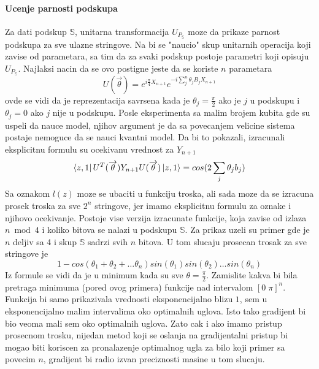 \documentclass[12pt, letterpaper, oneside]{article}
\begin{document}
\paragraph{Ucenje parnosti podskupa}
Za dati podskup $\mathbb{S}$, unitarna transformacija $U_{P_\mathbb{S}}$ moze da prikaze parnost podskupa za sve ulazne stringove.
Na bi se "naucio" skup unitarnih operacija koji zavise od parametara, sa tim da za svaki podskup postoje parametri koji opisuju $U_{P_\mathbb{S}}$.
Najlaksi nacin da se ovo postigne jeste da se koriste $n$ parametara
\[
    U(\overrightarrow{\theta}) = e^{i\frac{\pi}{4}X_{n+1}}e^{-i\sum_j^n \theta_jB_jX_{n+1}}
\]
ovde se vidi da je reprezentacija savrsena kada je $\theta_j = \frac{\pi}{2}$ ako je $j$ u podskupu i$\theta_j = 0$ ako $j$ nije u podskupu.
Posle eksperimenta sa malim brojem kubita gde su uspeli da nauce model, njihov argument je da sa povecanjem velicine sistema postaje nemoguce da se nauci kvantni model.
Da bi to pokazali, izracunali eksplicitnu formulu su ocekivanu vrednost za $Y_{n+1}$
\[
    \bra{z,1}U^T(\overrightarrow{\theta})Y_{n+1}U(\overrightarrow{\theta})\Ket{z,1} = cos(2\sum_j\theta_jb_j)
\]
Sa oznakom $l(z)$ moze se ubaciti u funkciju troska, ali sada moze da se izracuna prosek
troska za sve $2^n$ stringove, jer imamo eksplicitnu formulu za oznake i njihovo ocekivanje.
Postoje vise verzija izracunate funkcije, koja zavise od izlaza $n \bmod 4$ i koliko bitova se nalazi u podskupu $\mathbb{S}$.
Za prikaz uzeli su primer gde je $n$ deljiv sa 4 i skup $\mathbb{S}$ sadrzi svih $n$ bitova.
U tom slucaju prosecan trosak za sve stringove je 
\[
    1 - cos(\theta_1 + \theta_2 + \dots \theta_n)sin(\theta_1)sin(\theta_2) \dots sin(\theta_n)
\]
Iz formule se vidi da je u minimum kada su sve $\theta=\frac{\pi}{2}$. Zamislite kakva bi bila pretraga minimuma (pored ovog primera) funkcije
nad intervalom $[0\;\pi]^n$. Funkcija bi samo prikazivala vrednosti eksponencijalno blizu $1$, sem u eksponencijalno malim intervalima oko optimalnih uglova.
Isto tako gradijent bi bio veoma mali sem oko optimalnih uglova. Zato cak i ako imamo pristup prosecnom trosku, nijedan metod koji se oslanja na gradijentalni pristup
bi mogao biti koriscen za pronalazenje optimalnog ugla za bilo koji primer sa povecim $n$, gradijent bi radio izvan preciznosti masine u tom slucaju.
\end{document}
